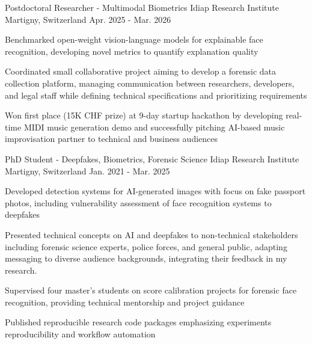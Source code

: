 

\begin{cventries}

\cventry
    {Postdoctoral Researcher - Multimodal Biometrics} %
    {Idiap Research Institute} %
    {Martigny, Switzerland} %
    {Apr. 2025 - Mar. 2026} %
    {
      \begin{cvitems} %
        \item {Benchmarked open-weight vision-language models for explainable face recognition, developing novel metrics to quantify explanation quality}
        \item {Coordinated small collaborative project aiming to develop a forensic data collection platform, managing communication between researchers, developers, and legal staff while defining technical specifications and prioritizing requirements}
        \item {Won first place (15K CHF prize) at 9-day startup hackathon by developing real-time MIDI music generation demo and successfully pitching AI-based music improvisation partner to technical and business audiences}
      \end{cvitems}
    }

  \cventry
    {PhD Student - Deepfakes, Biometrics, Forensic Science} %
    {Idiap Research Institute} %
    {Martigny, Switzerland} %
    {Jan. 2021 - Mar. 2025} %
    {
      \begin{cvitems} %
        \item {Developed detection systems for AI-generated images with focus on fake passport photos, including vulnerability assessment of face recognition systems to deepfakes}
        \item {Presented technical concepts on AI and deepfakes to non-technical stakeholders including forensic science experts, police forces, and general public, adapting messaging to diverse audience backgrounds, integrating their feedback in my research.}
        \item {Supervised four master's students on score calibration projects for forensic face recognition, providing technical mentorship and project guidance}
        \item {Published reproducible research code packages emphasizing experiments reproducibility and workflow automation}
      \end{cvitems}
    }


\end{cventries}
